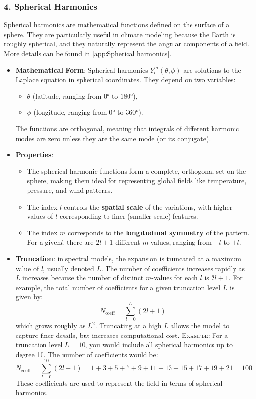 \subsubsection{4. \textbf{Spherical Harmonics}}

Spherical harmonics are mathematical functions defined on the surface of a sphere. They are particularly useful in climate modeling because the Earth is roughly spherical, and they naturally represent the angular components of a field. More details can be found in \ref{app:Spherical harmonics}.

\begin{itemize}
    \item \textbf{Mathematical Form}: Spherical harmonics $Y_l^m(\theta,\phi)$ are solutions to the Laplace equation in spherical coordinates. They depend on two variables:
    \begin{itemize}
        \item $\theta$ (latitude, ranging from $0°$ to $180°$),
        \item $\phi$ (longitude, ranging from $0°$ to $360°$).
    \end{itemize}The functions are orthogonal, meaning that integrals of different harmonic modes are zero unless they are the same mode (or its conjugate).
    \item \textbf{Properties}:
    \begin{itemize}
        \item The spherical harmonic functions form a complete, orthogonal set on the sphere, making them ideal for representing global fields like temperature, pressure, and wind patterns.
        \item The index $l$ controls the \textbf{spatial scale} of the variations, with higher values of $l$ corresponding to finer (smaller-scale) features.
        \item The index $m$ corresponds to the \textbf{longitudinal symmetry} of the pattern. For a given$l$, there are $2l+1$ different $m$-values, ranging from $-l$ to $+l$.
    \end{itemize}
    \item \textbf{Truncation}: in spectral models, the expansion is truncated at a maximum value of $l$, usually denoted $L$. The number of coefficients increases rapidly as $L$ increases because the number of distinct $m$-values for each $l$ is $2l+1$. For example, the total number of coefficients for a given truncation level $L$ is given by:
    $$N_{\text{coeff}}=\displaystyle\sum_{l=0}^L(2l+1)$$
    which grows roughly as $L^2$. Truncating at a high $L$ allows the model to capture finer details, but increases computational cost.
    \textsc{Example}: For a truncation level $L=10$, you would include all spherical harmonics up to degree 10. The number of coefficients would be:$$N_{\text{coeff}}=\displaystyle\sum_{l=0}^{10}(2l+1)=1+3+5+7+9+11+13+15+17+19+21=100$$
    These coefficients are used to represent the field in terms of spherical harmonics.
\end{itemize}


